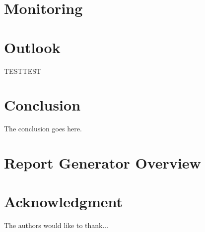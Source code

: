 \documentclass[journal]{IEEEtran}
\begin{document}
\section{Monitoring}









\section{Outlook}



TESTTEST



\section{Conclusion}

The conclusion goes here.



\section{Report Generator Overview}





\section*{Acknowledgment}

The authors would like to thank...

\ifCLASSOPTIONcaptionsoff

  \newpage

\fi





\printbibliography
\end{document}
